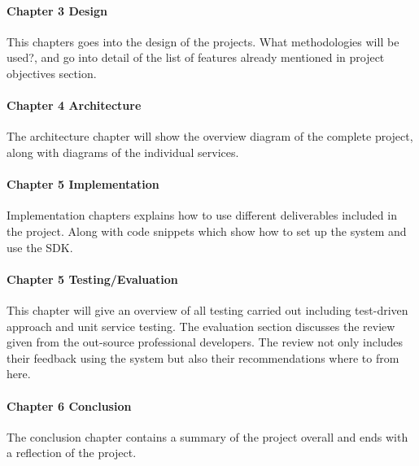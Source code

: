 \paragraph{Chapter 3 Design}

This chapters goes into the design of the projects. What methodologies will be used?, and go into detail of the list of features already mentioned in project objectives section.

\paragraph{Chapter 4 Architecture}

The architecture chapter will show the overview diagram of the complete project, along with diagrams of the individual services.

\paragraph{Chapter 5 Implementation}

Implementation chapters explains how to use different deliverables included in the project. Along with code snippets which show how to set up the system 
and use the SDK.

\paragraph{Chapter 5 Testing/Evaluation}

This chapter will give an overview of all testing carried out including test-driven approach and unit service testing. The evaluation section discusses the review given from the out-source professional developers. The review not only includes their feedback using the system but also their recommendations where to from here. 

\paragraph{Chapter 6 Conclusion}

The conclusion chapter contains a summary of the project overall and ends with a reflection of the project.